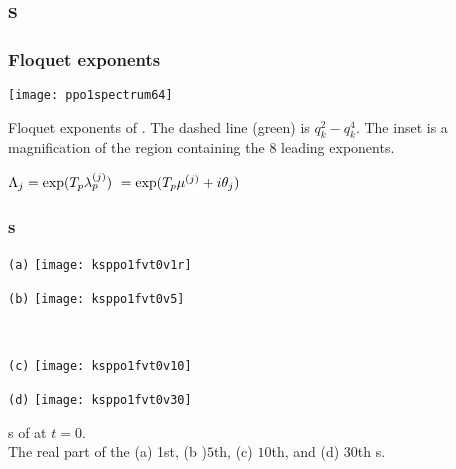 \subsection{\Fv s}

\begin{frame}[shrink]
  \frametitle{Floquet exponents}

  
  {\centering
    \texttt{[image: ppo1spectrum64]}
    \par}
  {\scriptsize \centering
    Floquet exponents of .
    The dashed line (green) is
    $q_{k}^{2}-q_{k}^{4}$. The inset is a magnification of the region
    containing the 8 leading exponents.
    \par}

  {\centering

    $
      \ExpaEig_{j} = \exp(\period{p}\Lyap^{(j)}_p)\
      = \exp(\period{p}\eigRe[j] + i\theta_j)
    $
  \par}

\end{frame}

\begin{frame}[shrink]%
  \frametitle{\Fv s}

  {\centering
    \begin{minipage}{0.3\textwidth}
      \centering \small{\texttt{(a)}}
      \texttt{[image: ksppo1fvt0v1r]}
    \end{minipage}
    \begin{minipage}{0.3\textwidth}
      \centering \small{\texttt{(b)}}
      \texttt{[image: ksppo1fvt0v5]}
    \end{minipage} \\
    \begin{minipage}{0.3\textwidth}
      \centering \small{\texttt{(c)}}
      \texttt{[image: ksppo1fvt0v10]}
    \end{minipage}
    \begin{minipage}{0.3\textwidth}
      \centering \small{\texttt{(d)}}
      \texttt{[image: ksppo1fvt0v30]}
    \end{minipage}
    \par}
  { \scriptsize \centering 
    \Fv s of  at $t=0$. \\
    The real part of  the
    (a) 1st, (b )$5$th, (c) $10$th, and (d) $30$th \Fv s.
  }
\end{frame}

